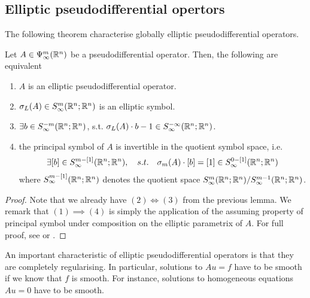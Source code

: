 \documentclass[12pt]{article}
\begin{document}
\subsection{Elliptic pseudodifferential opertors}
The following theorem characterise globally elliptic pseudodifferential operators. 
\begin{ftheorem}
    Let $A \in \Psi^{m}_{\infty}({\mathbb R}^n)$ be a pseudodifferential operator. Then, the following are equivalent
    \begin{enumerate}
        \item $A$ is an elliptic pseudodifferential operator.
        
        \item $\sigma_L(A) \in S^{m}_\infty({\mathbb R}^{n}; {\mathbb R}^n)$ is an elliptic symbol.
                
        \item $\exists b \in S^{- m}_\infty({\mathbb R}^{n}; {\mathbb R}^n)$, s.t. $\sigma_L(A) \cdot b -1 \in S^{-\infty }_\infty({\mathbb R}^{n}; {\mathbb R}^n)$. 
        
        \item the principal symbol of $A$ is invertible in the quotient symbol space, i.e. 
        \begin{align*}
        \exists [b] \in S^{m - [1]}_\infty({\mathbb R}^{n}; {\mathbb R}^n), \quad s.t. \quad \sigma_m(A) \cdot [b] = [1] \in S^{0 - [1]}_\infty({\mathbb R}^{n}; {\mathbb R}^n)
        \end{align*}
        where $S^{m-[1]}_\infty({\mathbb R}^{n}; {\mathbb R}^n)$ denotes the quotient space $S^{m}_\infty({\mathbb R}^{n}; {\mathbb R}^n) / S^{m -1}_\infty({\mathbb R}^{n}; {\mathbb R}^n)$. 

    \end{enumerate}
\end{ftheorem}
\begin{proof}
    Note that we already have $(2) \iff (3)$ from the previous lemma. We remark that $(1) \implies (4)$ is simply the application of the assuming property of principal symbol under composition on the elliptic parametrix of $A$. For full proof, see \cite{Vasy2015-oo} or \cite{rbm_intro_microlocal}. 
    
\end{proof}


An important characteristic of elliptic pseudodifferential operators is that they are completely regularising. In particular, solutions to $Au = f$ have to be smooth if we know that $f$ is smooth. For instance, solutions to homogeneous equations $Au = 0$ have to be smooth. 
\end{document}

